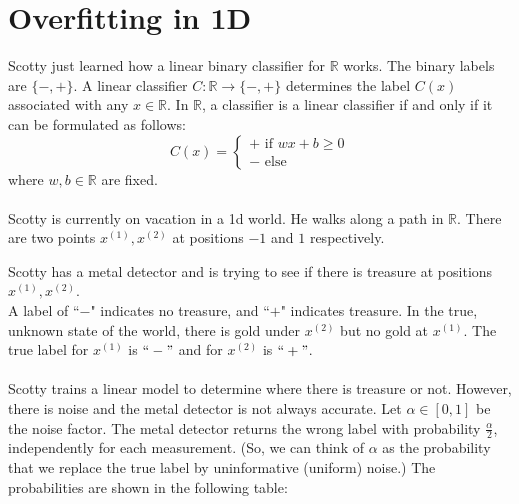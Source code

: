 \section{Overfitting in 1D}
Scotty just learned how a linear binary classifier for  $\mathbb{R}$ works. The binary labels are $\{-,+\}$. A linear classifier $C: \mathbb{R} \to \{-,+\}$ determines the label $C(x)$ associated with any $x \in \mathbb{R}$. In $\mathbb{R}$, a classifier is a linear classifier if and only if it can be formulated as follows: 
\[
C(x) = \begin{cases}
    + \text{ if } wx + b \geq 0 \\
    - \text{ else}
\end{cases}
\]
where $w, b \in \mathbb{R}$ are fixed. \\
\\
Scotty is currently on vacation in a 1d world. He walks along a path in $\mathbb{R}$. There are two points $x^{(1)},x^{(2)}$ at positions $-1$ and $1$ respectively. 


\begin{center}
\end{center}


Scotty has a metal detector and is trying to see if there is treasure at positions $x^{(1)},x^{(2)}$. \\
A label of ``$-$" indicates no treasure, and ``$+$" indicates treasure. In the true, unknown state of the world, there is gold under $x^{(2)}$ but no gold at $x^{(1)}$. The true label for $x^{(1)}$ is $``-"$ and for $x^{(2)}$ is $``+"$. \\
\\
Scotty trains a linear model to determine where there is treasure or not. However, there is noise and the metal detector is not always accurate. Let $\alpha \in [0,1]$ be the noise factor. The metal detector returns the wrong label with probability $\frac{\alpha}{2}$, independently for each measurement. (So, we can think of $\alpha$ as the probability that we replace the true label by uninformative (uniform) noise.) The probabilities are shown in the following table:


